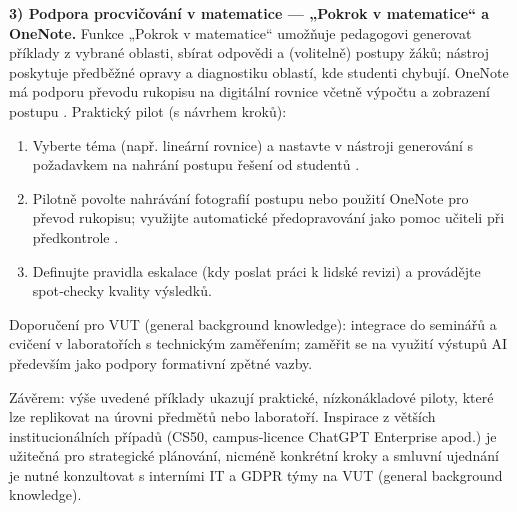\medskip

\textbf{3) Podpora procvičování v matematice — „Pokrok v matematice“ a OneNote.}  
Funkce „Pokrok v matematice“ umožňuje pedagogovi generovat příklady z vybrané oblasti, sbírat odpovědi a (volitelně) postupy žáků; nástroj poskytuje předběžné opravy a diagnostiku oblastí, kde studenti chybují. OneNote má podporu převodu rukopisu na digitální rovnice včetně výpočtu a zobrazení postupu \cite{kb_ai_101_tipu_pdf_04e4a115_page_8_1}.  
Praktický pilot (s návrhem kroků):
\begin{enumerate}
  \item Vyberte téma (např. lineární rovnice) a nastavte v nástroji generování s požadavkem na nahrání postupu řešení od studentů \cite{kb_ai_101_tipu_pdf_04e4a115_page_8_1}.
  \item Pilotně povolte nahrávání fotografií postupu nebo použití OneNote pro převod rukopisu; využijte automatické předopravování jako pomoc učiteli při předkontrole \cite{kb_ai_101_tipu_pdf_04e4a115_page_8_1}.
  \item Definujte pravidla eskalace (kdy poslat práci k lidské revizi) a provádějte spot‑checky kvality výsledků.
\end{enumerate}
Doporučení pro VUT (general background knowledge): integrace do seminářů a cvičení v laboratořích s technickým zaměřením; zaměřit se na využití výstupů AI především jako podpory formativní zpětné vazby.

\medskip

Závěrem: výše uvedené příklady ukazují praktické, nízkonákladové piloty, které lze replikovat na úrovni předmětů nebo laboratoří. Inspirace z větších institucionálních případů (CS50, campus‑licence ChatGPT Enterprise apod.) je užitečná pro strategické plánování, nicméně konkrétní kroky a smluvní ujednání je nutné konzultovat s interními IT a GDPR týmy na VUT (general background knowledge).
